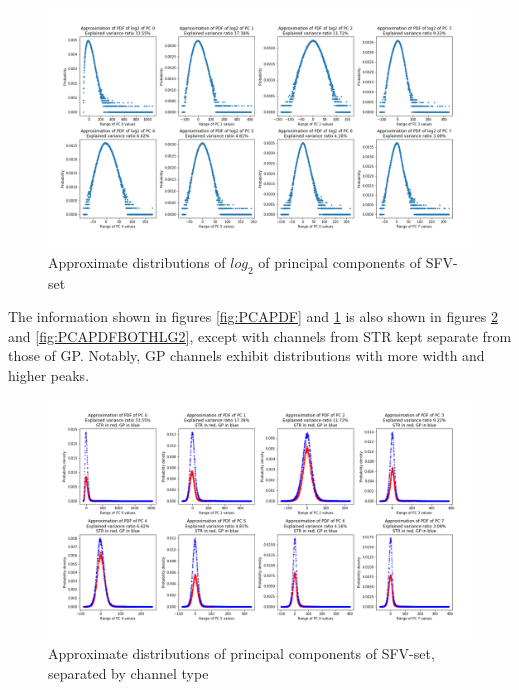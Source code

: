 \documentclass{article}
\begin{document}
\begin{figure}[H]
    \centering
    \centerline{\includegraphics[width=1\textwidth]{images/PCA/PCAPDFLG2.png}}
    \caption{Approximate distributions of \begin{math}log_2\end{math} of principal components of SFV-set}
    \label{fig:PCAPDFLG2}
\end{figure}

The information shown in figures \ref{fig:PCAPDF} and \ref{fig:PCAPDFLG2} is also shown in figures \ref{fig:PCAPDFBOTH} and \ref{fig:PCAPDFBOTHLG2}, except with channels from STR kept separate from those of GP.
Notably, GP channels exhibit distributions with more width and higher peaks.

\begin{figure}[H]
    \centering
    \centerline{\includegraphics[width=1\textwidth]{images/PCA/PCABOTH.png}}
    \caption{Approximate distributions of principal components of SFV-set, separated by channel type}
    \label{fig:PCAPDFBOTH}
\end{figure}
\end{document}
